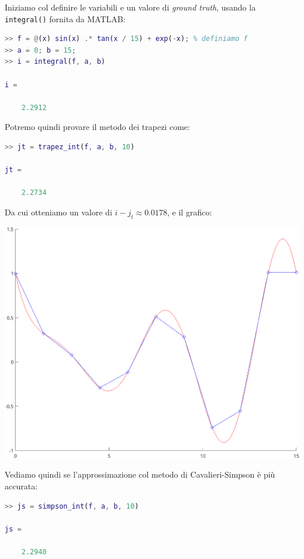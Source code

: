 \documentclass[a4paper,11pt]{article}
\begin{document}
Iniziamo col definire le variabili e un valore di \textit{ground truth}, usando la \lstinline|integral()| fornita da MATLAB:
\begin{lstlisting}[language=MATLAB, style=codestyle]	
>> f = @(x) sin(x) .* tan(x / 15) + exp(-x); % definiamo f
>> a = 0; b = 15;
>> i = integral(f, a, b)

i =

    2.2912
\end{lstlisting}

Potremo quindi provare il metodo dei trapezi come:
\begin{lstlisting}[language=MATLAB, style=codestyle]	
>> jt = trapez_int(f, a, b, 10)

jt =

    2.2734
\end{lstlisting}

Da cui otteniamo un valore di $i - j_t \approx 0.0178$, e il grafico:
\begin{center}
	\includegraphics{../figures/matlab_trapez_int.png}
\end{center}

Vediamo quindi se l'approssimazione col metodo di Cavalieri-Simpson è più accurata:
\begin{lstlisting}[language=MATLAB, style=codestyle]	
>> js = simpson_int(f, a, b, 10)

js =

    2.2940
\end{lstlisting}
\end{document}
